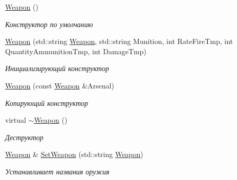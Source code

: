 \begin{DoxyCompactItemize}
\item 
\mbox{\label{class_aircraft_carrier_group_1_1_weapon_a65132027a67856e1adbdb603d5d40d8e}} 
\mbox{\hyperlink{class_aircraft_carrier_group_1_1_weapon_a65132027a67856e1adbdb603d5d40d8e}{Weapon}} ()
\begin{DoxyCompactList}\small\item\em Конструктор по умолчанию \end{DoxyCompactList}\item 
\mbox{\hyperlink{class_aircraft_carrier_group_1_1_weapon_a873b32cd3111fc6106d7f13eb4c17e83}{Weapon}} (std\+::string \mbox{\hyperlink{class_aircraft_carrier_group_1_1_weapon}{Weapon}}, std\+::string Munition, int Rate\+Fire\+Tmp, int Quantity\+Ammunition\+Tmp, int Damage\+Tmp)
\begin{DoxyCompactList}\small\item\em Инициализирующий конструктор \end{DoxyCompactList}\item 
\mbox{\hyperlink{class_aircraft_carrier_group_1_1_weapon_afd4999fbde839ecc830fc0786ad84b68}{Weapon}} (const \mbox{\hyperlink{class_aircraft_carrier_group_1_1_weapon}{Weapon}} \&Arsenal)
\begin{DoxyCompactList}\small\item\em Копирующий конструктор \end{DoxyCompactList}\item 
\mbox{\label{class_aircraft_carrier_group_1_1_weapon_ab02b48426ec21031c18a57d930265411}} 
virtual \mbox{\hyperlink{class_aircraft_carrier_group_1_1_weapon_ab02b48426ec21031c18a57d930265411}{$\sim$\+Weapon}} ()
\begin{DoxyCompactList}\small\item\em Деструктор \end{DoxyCompactList}\item 
\mbox{\hyperlink{class_aircraft_carrier_group_1_1_weapon}{Weapon}} \& \mbox{\hyperlink{class_aircraft_carrier_group_1_1_weapon_a3a73357d6f4f8676192cc10f255e82d2}{Set\+Weapon}} (std\+::string \mbox{\hyperlink{class_aircraft_carrier_group_1_1_weapon}{Weapon}})
\begin{DoxyCompactList}\small\item\em Устанавливает названия оружия \end{DoxyCompactList}\item 

\end{DoxyCompactItemize}
